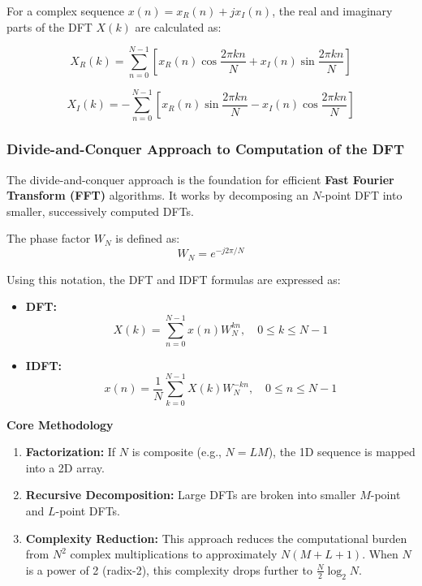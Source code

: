 For a complex sequence \(x(n) = x_R(n) + jx_I(n)\), the real and
imaginary parts of the DFT \(X(k)\) are calculated as:

\[X_R(k) = \sum_{n=0}^{N-1} \left[ x_R(n) \cos \frac{2\pi kn}{N} + x_I(n) \sin \frac{2\pi kn}{N} \right]\]

\[X_I(k) = -\sum_{n=0}^{N-1} \left[ x_R(n) \sin \frac{2\pi kn}{N} - x_I(n) \cos \frac{2\pi kn}{N} \right]\]

\hypertarget{divide-and-conquer-approach-to-computation-of-the-dft}{%
\subsubsection{Divide-and-Conquer Approach to Computation of the
DFT}\label{divide-and-conquer-approach-to-computation-of-the-dft}}

The divide-and-conquer approach is the foundation for efficient
\textbf{Fast Fourier Transform (FFT)} algorithms. It works by
decomposing an \(N\)-point DFT into smaller, successively computed DFTs.

The phase factor \(W_N\) is defined as: \[W_N = e^{-j2\pi/N}\]

Using this notation, the DFT and IDFT formulas are expressed as:

\begin{itemize}
\tightlist
\item
  \textbf{DFT:}
  \[X(k) = \sum_{n=0}^{N-1} x(n) W_N^{kn}, \quad 0 \le k \le N-1\]
\item
  \textbf{IDFT:}
  \[x(n) = \frac{1}{N} \sum_{k=0}^{N-1} X(k) W_N^{-kn}, \quad 0 \le n \le N-1\]
\end{itemize}

\textbf{Core Methodology}

\begin{enumerate}
\def\labelenumi{\arabic{enumi}.}
\tightlist
\item
  \textbf{Factorization:} If \(N\) is composite (e.g., \(N = LM\)), the
  1D sequence is mapped into a 2D array.
\item
  \textbf{Recursive Decomposition:} Large DFTs are broken into smaller
  \(M\)-point and \(L\)-point DFTs.
\item
  \textbf{Complexity Reduction:} This approach reduces the computational
  burden from \textbf{\(N^2\)} complex multiplications to approximately
  \textbf{\(N(M + L + 1)\)}. When \(N\) is a power of 2 (radix-2), this
  complexity drops further to \textbf{\(\frac{N}{2} \log_2 N\)}.
\end{enumerate}

